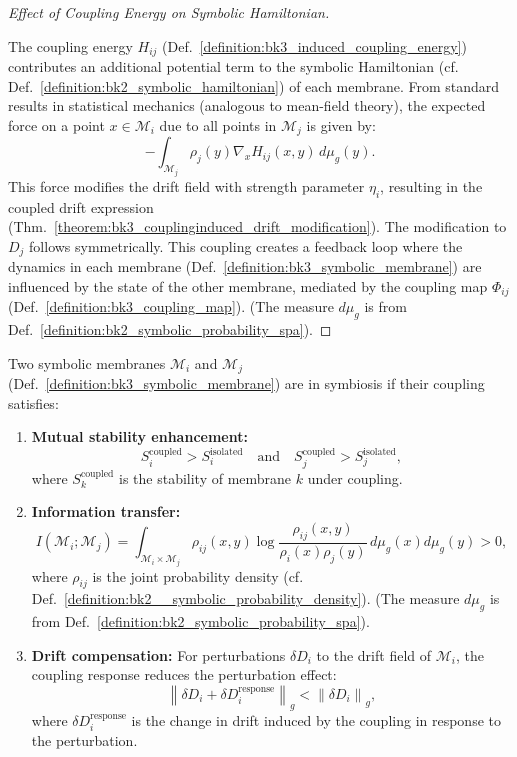 \begin{proof}[Effect of Coupling Energy on Symbolic Hamiltonian]
\label{proof:bk3_coupling_energy_symbolic_hamiltonian}
\leavevmode

The coupling energy \( H_{ij} \) (Def.~\ref{definition:bk3_induced_coupling_energy}) contributes an additional potential term to the symbolic Hamiltonian (cf. Def.~\ref{definition:bk2_symbolic_hamiltonian}) of each membrane.
From standard results in statistical mechanics (analogous to mean-field theory), the expected force on a point \( x \in \mathcal{M}_i \) due to all points in \( \mathcal{M}_j \) is given by:
\[
-\int_{\mathcal{M}_j} \rho_j(y) \nabla_x H_{ij}(x, y) \, d\mu_g(y).
\]
This force modifies the drift field with strength parameter \( \eta_i \), resulting in the coupled drift expression (Thm.~\ref{theorem:bk3_couplinginduced_drift_modification}). The modification to \( D_j \) follows symmetrically.
This coupling creates a feedback loop where the dynamics in each membrane (Def.~\ref{definition:bk3_symbolic_membrane}) are influenced by the state of the other membrane, mediated by the coupling map \( \Phi_{ij} \) (Def.~\ref{definition:bk3_coupling_map}). (The measure $d\mu_g$ is from Def.~\ref{definition:bk2_symbolic_probability_spa}).
\end{proof}

\begin{definition} \label{definition:bk3_symbolic_symbiosis}
Two symbolic membranes $\mathcal{M}_i$ and $\mathcal{M}_j$ (Def.~\ref{definition:bk3_symbolic_membrane}) are in symbiosis if their coupling satisfies:
\begin{enumerate}
    \item \textbf{Mutual stability enhancement:} 
    \[
    S_i^{\text{coupled}} > S_i^{\text{isolated}} \quad \text{and} \quad 
    S_j^{\text{coupled}} > S_j^{\text{isolated}},
    \]
    where \( S_k^{\text{coupled}} \) is the stability of membrane \( k \) under coupling.
    \item \textbf{Information transfer:} 
    \[
    I(\mathcal{M}_i; \mathcal{M}_j) = \int_{\mathcal{M}_i \times \mathcal{M}_j} 
    \rho_{ij}(x,y) \log \frac{\rho_{ij}(x,y)}{\rho_i(x) \rho_j(y)} \, d\mu_g(x) d\mu_g(y) > 0,
    \]
    where \( \rho_{ij} \) is the joint probability density (cf. Def.~\ref{definition:bk2__symbolic_probability_density}). (The measure $d\mu_g$ is from Def.~\ref{definition:bk2_symbolic_probability_spa}).
    \item \textbf{Drift compensation:} For perturbations \( \delta D_i \) to the drift field of \( \mathcal{M}_i \), the coupling response reduces the perturbation effect:
    \[
    \left\| \delta D_i + \delta D_i^{\text{response}} \right\|_g 
    < \left\| \delta D_i \right\|_g,
    \]
    where \( \delta D_i^{\text{response}} \) is the change in drift induced by the coupling in response to the perturbation.
\end{enumerate}
\end{definition}

